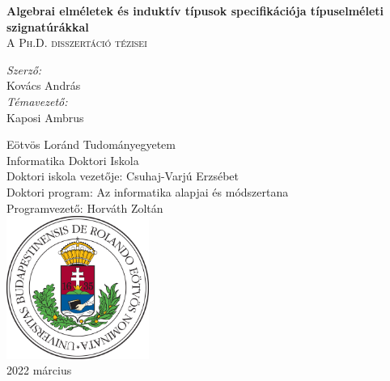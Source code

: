 \documentclass[12pt]{article}
\begin{document}
\clearpage

\begin{titlepage}
    \begin{center}
        \vspace*{1cm}

        {\LARGE \textbf{Algebrai elméletek és induktív típusok specifikációja típuselméleti szignatúrákkal}}\\
        \vspace{1em}
        {\large \textsc{A Ph.D. disszertáció tézisei}}

        \vspace{2em}

        \textit{Szerző:}\\
        {\large Kovács András}\\
        \vspace{1em}
        \textit{Témavezető:}\\
        {\large Kaposi Ambrus}

        \vfill
        \vspace{4em}

        {\normalsize
        Eötvös Loránd Tudományegyetem\\
        Informatika Doktori Iskola\\
        Doktori iskola vezetője: Csuhaj-Varjú Erzsébet\\
        Doktori program: Az informatika alapjai és módszertana\\
        Programvezető: Horváth Zoltán\\}
        \vspace{1em}
        \includegraphics[width=0.35\textwidth]{elte_cimer_szines}\\
        \vspace{1em}
        {\large 2022 március}

    \end{center}
\end{titlepage}
\thispagestyle{empty}
\end{document}
